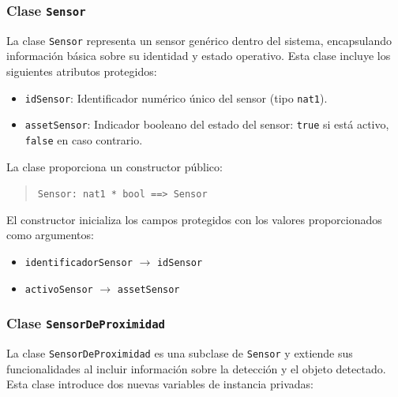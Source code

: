\documentclass[journal]{IEEEtran}
\begin{document}


    \subsubsection*{Clase \texttt{Sensor}}

    La clase \texttt{Sensor} representa un sensor genérico dentro del sistema, encapsulando información básica sobre su identidad y estado operativo. Esta clase incluye los siguientes atributos protegidos:

    \begin{itemize}
    \item \texttt{idSensor}: Identificador numérico único del sensor (tipo \texttt{nat1}).
    \item \texttt{assetSensor}: Indicador booleano del estado del sensor: \texttt{true} si está activo, \texttt{false} en caso contrario.
    \end{itemize}

    La clase proporciona un constructor público:

    \begin{quote}
    \texttt{Sensor: nat1 * bool \texttt{==>} Sensor}
    \end{quote}

    El constructor inicializa los campos protegidos con los valores proporcionados como argumentos:

    \begin{itemize}
    \item \texttt{identificadorSensor} $\rightarrow$ \texttt{idSensor}
    \item \texttt{activoSensor} $\rightarrow$ \texttt{assetSensor}
    \end{itemize}




    \subsubsection*{Clase \texttt{SensorDeProximidad}}

    La clase \texttt{SensorDeProximidad} es una subclase de \texttt{Sensor} y extiende sus funcionalidades al incluir información sobre la detección y el objeto detectado. Esta clase introduce dos nuevas variables de instancia privadas:
\end{document}
